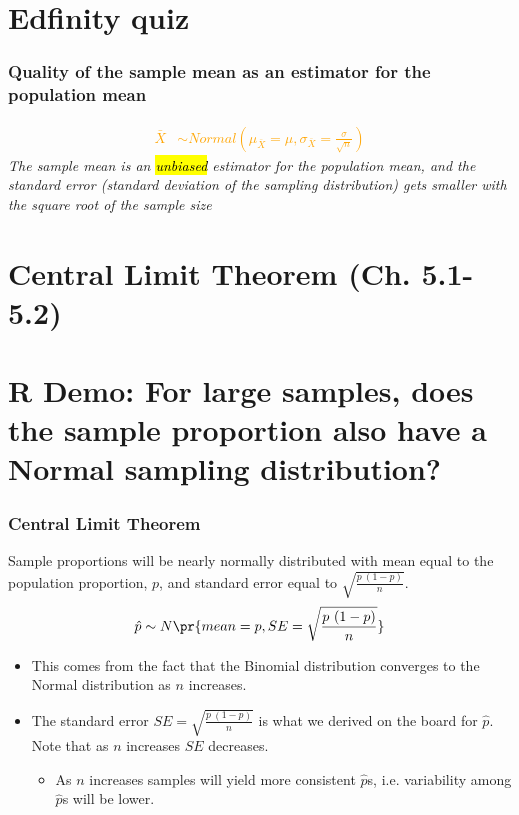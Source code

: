 \documentclass[t,compress,mathserif]{beamer}
\newcommand{\soln}[1]{\textit{#1}}
\begin{document}

\section{Edfinity quiz}

\begin{frame}
\frametitle{Quality of the sample mean as an estimator for the population mean}
\textcolor{orange}{
\begin{align*}
 \bar{X} &\sim Normal\left(\mu_{\bar{X}}=\mu, \sigma_{\bar{X}}=\frac{\sigma}{\sqrt{n}}\right)
\end{align*}
}
\soln{
The sample mean is an \hl{unbiased} estimator for the population mean, and the standard error (standard deviation of the sampling distribution) gets smaller with the square root of the sample size}

\end{frame}

\section{Central Limit Theorem (Ch. 5.1-5.2)}


\section{R Demo: For large samples, does the sample proportion also have a Normal sampling distribution? }


\begin{frame}
\frametitle{Central Limit Theorem}

{Sample proportions will be nearly normally distributed with mean equal to the population proportion, $p$, and standard error equal to $\sqrt{\frac{p~(1-p)}{n}}$.
\[ \hat{p} \sim N \pr{ mean = p, SE = \sqrt{\frac{p~(1-p)}{n}} } \]
}

\begin{itemize}

\item This comes from the fact that the Binomial distribution converges to the Normal distribution as $n$ increases.
\item The standard error $SE =  \sqrt{\frac{p~(1-p)}{n}}$ is what we derived on the board for $\hat{p}$. Note that as $n$ increases $SE$ decreases.
\begin{itemize}
\item As $n$ increases samples will yield more consistent $\hat{p}$s, i.e. variability among $\hat{p}$s will be lower.
\end{itemize}

\end{itemize}

\end{frame}
\end{document}
